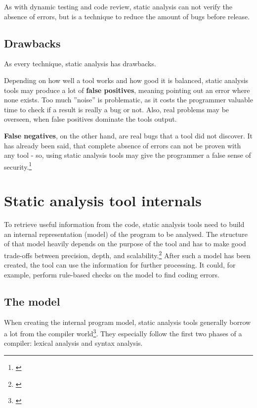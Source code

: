 As with dynamic testing and code review, static analysis can not verify the absence of errors, but is a technique to reduce the amount of bugs before release.

\subsection{Drawbacks}

As every technique, static analysis has drawbacks. 

Depending on how well a tool works and how good it is balanced, static analysis tools may produce a lot of \textbf{false positives}, meaning pointing out an error where none exists. Too much ''noise'' is problematic, as it costs the programmer valuable time to check if a result is really a bug or not. Also, real problems may be overseen, when false positives dominate the tools output.

\textbf{False negatives}, on the other hand, are real bugs that a tool did not discover. It has already been said, that complete absence of errors can not be proven with any tool - so, using static analysis tools may give the programmer a false sense of security.\footnote{\citep[23]{SecureProgramming}}


\section{Static analysis tool internals}

To retrieve useful information from the code, static analysis tools need to build an internal representation (model) of the program to be analysed. The structure of that model heavily depends on the purpose of the tool and has to make good trade-offs between precision, depth, and scalability.\footnote{\citep[45]{SecureProgramming}} After such a model has been created, the tool can use the information for further processing. It could, for example, perform rule-based checks on the model to find coding errors.

\subsection{The model}

When creating the internal program model, static analysis tools generally borrow a lot from the compiler world\footnote{\citep[72]{SecureProgramming}}. They especially follow the first two phases of a compiler: lexical analysis and syntax analysis.

